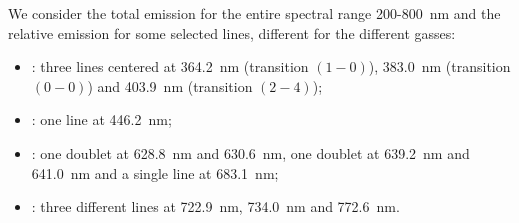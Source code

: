 We consider the total emission for the entire spectral range \num{200}-\SI{800}{\nano\meter} and the relative emission for some selected lines, different for the different gasses:
\begin{itemize}
 \item {} : three lines centered at \SI{364.2}{\nano\meter} (transition $(1-0)$), \SI{383.0}{\nano\meter} (transition $(0-0)$) and \SI{403.9}{\nano\meter} (transition $(2-4)$);
 \item {} : one line at \SI{446.2}{\nano\meter};
 \item {} : one doublet at \SI{628.8}{\nano\meter} and \SI{630.6}{\nano\meter}, one doublet at \SI{639.2}{\nano\meter} and \SI{641.0}{\nano\meter} and a single line at \SI{683.1}{\nano\meter};
 \item {} : three different lines at \SI{722.9}{\nano\meter}, \SI{734.0}{\nano\meter} and \SI{772.6}{\nano\meter}.
\end{itemize}


